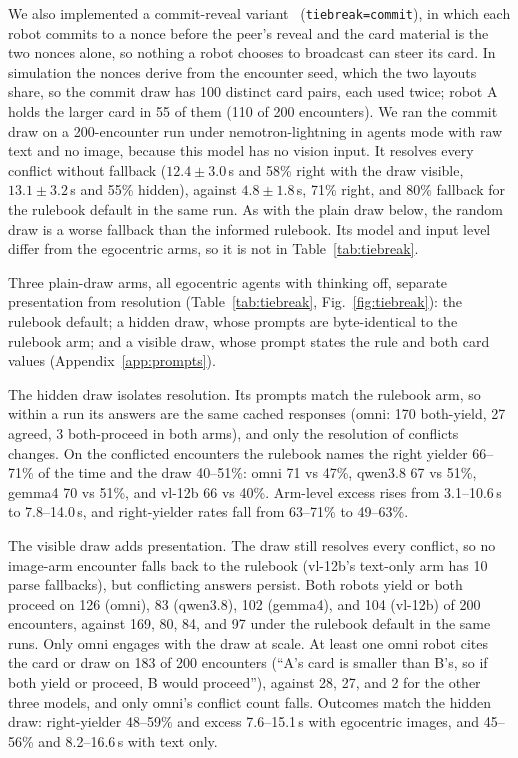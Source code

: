 \documentclass[journal]{IEEEtran}
\begin{document}
We also implemented a commit-reveal variant~\cite{blum1983coin} (\texttt{tiebreak=commit}), in which each robot commits to a nonce before the peer's reveal and the card material is the two nonces alone, so nothing a robot chooses to broadcast can steer its card. In simulation the nonces derive from the encounter seed, which the two layouts share, so the commit draw has 100 distinct card pairs, each used twice; robot A holds the larger card in 55 of them (110 of 200 encounters). We ran the commit draw on a 200-encounter run under nemotron-lightning in agents mode with raw text and no image, because this model has no vision input. It resolves every conflict without fallback ($12.4\pm3.0$\,s and 58\% right with the draw visible, $13.1\pm3.2$\,s and 55\% hidden), against $4.8\pm1.8$\,s, 71\% right, and 80\% fallback for the rulebook default in the same run. As with the plain draw below, the random draw is a worse fallback than the informed rulebook. Its model and input level differ from the egocentric arms, so it is not in Table~\ref{tab:tiebreak}. %

Three plain-draw arms, all egocentric agents with thinking off, separate presentation from resolution (Table~\ref{tab:tiebreak}, Fig.~\ref{fig:tiebreak}): the rulebook default; a hidden draw, whose prompts are byte-identical to the rulebook arm; and a visible draw, whose prompt states the rule and both card values (Appendix~\ref{app:prompts}).

The hidden draw isolates resolution. Its prompts match the rulebook arm, so within a run its answers are the same cached responses (omni: 170 both-yield, 27 agreed, 3 both-proceed in both arms), and only the resolution of conflicts changes. On the conflicted encounters the rulebook names the right yielder 66--71\% of the time and the draw 40--51\%: omni 71 vs 47\%, qwen3.8 67 vs 51\%, gemma4 70 vs 51\%, and vl-12b 66 vs 40\%. Arm-level excess rises from 3.1--10.6\,s to 7.8--14.0\,s, and right-yielder rates fall from 63--71\% to 49--63\%.

The visible draw adds presentation. The draw still resolves every conflict, so no image-arm encounter falls back to the rulebook (vl-12b's text-only arm has 10 parse fallbacks), but conflicting answers persist. Both robots yield or both proceed on 126 (omni), 83 (qwen3.8), 102 (gemma4), and 104 (vl-12b) of 200 encounters, against 169, 80, 84, and 97 under the rulebook default in the same runs. Only omni engages with the draw at scale. At least one omni robot cites the card or draw on 183 of 200 encounters (``A's card is smaller than B's, so if both yield or proceed, B would proceed''), against 28, 27, and 2 for the other three models, and only omni's conflict count falls. Outcomes match the hidden draw: right-yielder 48--59\% and excess 7.6--15.1\,s with egocentric images, and 45--56\% and 8.2--16.6\,s with text only.
\end{document}
